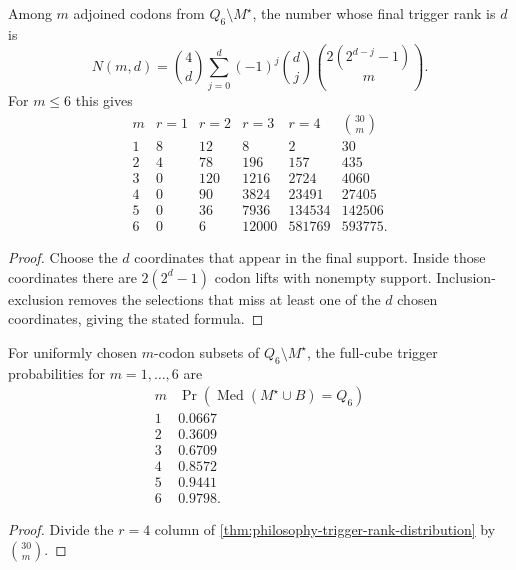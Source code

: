 \begin{theorem}
\label{thm:philosophy-trigger-rank-distribution}
Among $m$ adjoined codons from $Q_{6}\setminus M^{\star}$, the number
whose final trigger rank is $d$ is
$$
  N(m,d)
  =
  \binom{4}{d}
  \sum_{j=0}^{d}
  (-1)^{j}
  \binom{d}{j}
  \binom{2(2^{d-j}-1)}{m}.
$$
For $m\leq 6$ this gives
$$
\begin{array}{r|rrrr|r}
  m & r=1 & r=2 & r=3 & r=4 & \binom{30}{m}\\
  \hline
  1 & 8 & 12 & 8 & 2 & 30\\
  2 & 4 & 78 & 196 & 157 & 435\\
  3 & 0 & 120 & 1216 & 2724 & 4060\\
  4 & 0 & 90 & 3824 & 23491 & 27405\\
  5 & 0 & 36 & 7936 & 134534 & 142506\\
  6 & 0 & 6 & 12000 & 581769 & 593775.
\end{array}
$$
\end{theorem}
\begin{proof}
Choose the $d$ coordinates that appear in the final support. Inside
those coordinates there are $2(2^{d}-1)$ codon lifts with nonempty
support. Inclusion-exclusion removes the selections that miss at least
one of the $d$ chosen coordinates, giving the stated formula.
\end{proof}

\begin{corollary}
\label{cor:philosophy-full-trigger-probabilities}
For uniformly chosen $m$-codon subsets of $Q_{6}\setminus M^{\star}$,
the full-cube trigger probabilities for $m=1,\ldots,6$ are
$$
\begin{array}{c|r}
  m & \Pr(\operatorname{Med}(M^{\star}\cup B)=Q_{6})\\
  \hline
  1 & 0.0667\\
  2 & 0.3609\\
  3 & 0.6709\\
  4 & 0.8572\\
  5 & 0.9441\\
  6 & 0.9798.
\end{array}
$$
\end{corollary}
\begin{proof}
Divide the $r=4$ column of
\autoref{thm:philosophy-trigger-rank-distribution} by $\binom{30}{m}$.
\end{proof}


